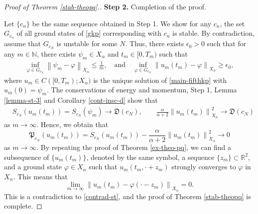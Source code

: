 \documentclass[10pt]{article}
\newcommand{\norm}[1]{\left\|   #1   \right\|}
\newcommand{\fd}{\mathfrak{D}}
\newcommand{\fp}{\mathfrak{P}}
\numberwithin{equation}{section}
\newcommand{\ff}{\varphi}
\newcommand{\N}{\mathbb{N}}
\newcommand{\al}{\alpha}
\newcommand{\rt}{{\mathbb{R}^2}}
\begin{document}
\begin{proof}[Proof of Theorem \ref{stab-theopq}.]
		
		
		
		
		
		
		
		
		\textbf{Step 2.} Completion of the proof.
		
		Let $\{c_n\}$ be the same sequence obtained in Step 1. We show for any $c_n$,  the set  $G_{c_n}$ of all ground states of \eqref{gkp} corresponding with $c_n$ is stable. By contradiction, assume that $G_{c_N}$ is unstable for some $N$. Thus, there exists $\epsilon_0>0$ such that for any $m\in\N$, there exists $\psi_m\in X_\al$ and $t_m\in[0,T_m)$ such that
		\begin{equation}\label{contrad-st}
			\begin{split}
				\inf_{\ff\in G_{c_N}}\norm{\psi_m-\ff}_{X_\al}\leq\frac1m,\quad\text{and}\quad
				\inf_{\ff\in G_{c_N}}\norm{u_m(t_m)-\ff}_{X_\al}\geq\epsilon_0,
			\end{split}
		\end{equation}
		where $u_m\in C([0,T_m);X_\al)$ is the unique solution of \eqref{main-fifthkp} with $u_m(0)=\psi_m$.
		The conservations of energy and momentum, Step 1, Lemma \ref{lemma-st-3} and Corollary \ref{cont-insc-d} show that
		\[
		\begin{split}
			&	S_{c_N}(u_m(t_m)) =S_{c_N}(\psi_m )\to \fd(c_N),\qquad
			\frac\al{\al+2}\norm{u_m(t_m)}_{\dot{X}_\al}^2\to\fd(c_N)
		\end{split}
		\]
		as $m\to\infty$. Hence, we obtain that
		\[
		\fp_{c_N}(u_m(t_m))=	S_{c_N}(u_m(t_m))-
		\frac\al{\al+2}\norm{u_m(t_m)}_{\dot{X}_\al}^2\to0
		\]
		as $m\to\infty$. By repeating the proof of Theorem \ref{ex-theo-pq}, we can find a subsequence of $\{u_m(t_m)\}$, denoted by the same symbol, a sequence $\{z_m\}\subset\rt$, and  a ground state $\ff\in X_\al$ such that $u_m(t_m,\cdot+z_m)$ strongly converges to $\ff$ in $X_\al$. This means that
		\[
		\lim_{m\to\infty}\norm{u_m(t_m)-\ff(\cdot-z_m)}_{X_\al}=0.
		\]
		This is a contradiction to \eqref{contrad-st}, and the proof of Theorem \ref{stab-theopq} is complete.
	\end{proof}
	
\end{document}
